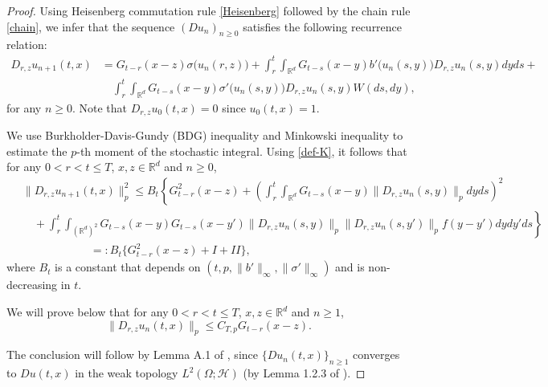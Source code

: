 \documentclass[12pt]{article}
\def\cH{\mathcal{H}}
\def\bR{\mathbb{R}}
\def\s{\sigma}
\begin{document}
\begin{proof}
Using Heisenberg commutation rule \eqref{Heisenberg} followed by the chain rule \eqref{chain}, we infer that the sequence $(Du_n)_{n\geq 0}$ satisfies the following recurrence relation:
\begin{align}
\nonumber
D_{r,z}u_{n+1}(t,x)&=G_{t-r}(x-z)\s\big(u_n(r,z)\big)+\int_r^t \int_{\bR^d}G_{t-s}(x-y) b'\big(u_n(s,y)\big)D_{r,z}u_n(s,y) dyds+\\
\label{rec-Dun}
&\quad \int_r^t \int_{\bR^d} G_{t-s}(x-y)\s'\big(u_n(s,y)\big) D_{r,z}u_n(s,y) W(ds,dy),
\end{align}
for any $n\geq 0$. Note that $D_{r,z}u_{0}(t,x)=0$ since $u_0(t,x)=1$. 

We use Burkholder-Davis-Gundy (BDG) inequality and Minkowski inequality to estimate the $p$-th moment of the stochastic integral. Using \eqref{def-K}, it follows that for any $0<r<t\leq T$, $x,z \in \bR^d$ and $n\geq 0$,
\begin{align}
\nonumber
&\|D_{r,z}u_{n+1}(t,x)\|_p^2  \leq B_{t} \left\{ G_{t-r}^2(x-z)+  \left(\int_r^t \int_{\bR^d} G_{t-s}(x-y)\|D_{r,z}u_n(s,y)\|_pdyds\right)^2 \right.\\	
\nonumber
& \quad +\left.\int_r^t \int_{(\bR^d)^2} G_{t-s}(x-y) G_{t-s}(x-y') \|D_{r,z}u_n(s,y)\|_p \|D_{r,z}u_n(s,y')\|_p  f(y-y') dydy'ds \right\} \\\
\label{recD1}
& \quad \quad \quad \quad \quad \quad  =: B_{t} \{ G_{t-r}^2(x-z)+  I+II \},
\end{align}
where $B_{t}$ is a constant that depends on $(t,p,\|b'\|_{\infty},\|\sigma'\|_{\infty})$ and is non-decreasing in $t$.

We will prove below that for any $0<r<t\leq T$, $x,z \in \bR^d$ and $n\geq 1$,
\begin{equation}
\label{key-un}
\|D_{r,z}u_{n}(t,x)\|_p \leq C_{T,p} G_{t-r}(x-z).
\end{equation}

The conclusion will follow by Lemma A.1 of \cite{BS26}, since $\{Du_n(t,x)\}_{n\geq 1}$ converges to $Du(t,x)$ in the weak topology $L^2(\Omega;\cH)$ (by Lemma 1.2.3 of \cite{nualart06}).

\medskip


\end{proof}
\end{document}
